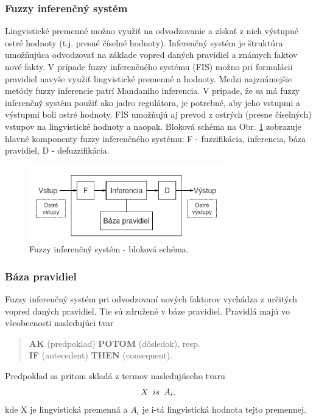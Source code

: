 \subsubsection{Fuzzy inferenčný systém}
Lingvistické premenné možno využiť na odvodzovanie a získať z nich výstupné ostré hodnoty (t.j. presné číselné hodnoty). 
Inferenčný systém je štruktúra umožňujúca odvodzovať na základe vopred daných pravidiel a známych faktov nové fakty. V prípade fuzzy inferenčného systému (FIS) možno pri formulácii pravidiel navyše využiť lingvistické premenné a hodnoty. Medzi najznámejšie metódy fuzzy inferencie patrí Mandaniho inferencia. \cite{gregorUI}
V prípade, že sa má fuzzy inferenčný systém použiť ako jadro regulátora, je potrebné, aby jeho vstupmi a výstupmi boli ostré hodnoty. FIS umožňujú aj prevod z ostrých (presne číselných) vstupov na lingvistické hodnoty a naopak. \cite{gregorUI}
Bloková schéma na Obr. \ref{fig:fis} zobrazuje hlavné komponenty fuzzy inferenčného systému: F - fuzzifikácia, inferencia, báza pravidiel, D - defuzzifikácia. 
\begin{figure}[h]
	\includegraphics[width=0.75\textwidth]{obrazky/obrazok1}
	\centering
	\caption{Fuzzy inferenčný systém - bloková schéma.\cite{gregorUI}}
	\label{fig:fis}
\end{figure}

\subsubsection{Báza pravidiel}
Fuzzy inferenčný systém pri odvodzovaní nových faktorov vychádza z určitých vopred daných pravidiel. Tie sú združené v báze pravidiel. Pravidlá majú vo všeobecnosti nasledujúci tvar \cite{gregorUI, gregorRef19, gregorref1}
\begin{quote}\centering
         \textbf{AK} (predpoklad)   \textbf{POTOM} (dôsledok), resp. \\
         \textbf{IF} (antecedent)  \textbf{THEN} (consequent).
\end{quote}
Predpoklad sa pritom skladá z termov nasledujúceho tvaru \cite{gregorUI}
\begin{equation}\label{baza1}
X \hspace{0.2cm} is \hspace{0.2cm}  A_i , 
\end{equation}
kde X je lingvistická premenná a $A_i$ je i-tá lingvistická hodnota tejto premennej. 

